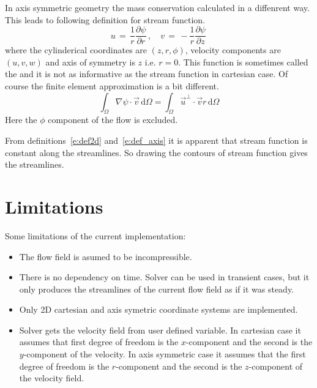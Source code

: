 \begin{versiona}
In axis symmetric geometry the mass conservation calculated in a diffenrent way.
This leads to following definition for stream function. 
\begin{equation}\label{e:def_axis}
u \, = \, \frac{1}{r}\frac{\partial \psi}{\partial r} \, , \quad
v \, = \, - \frac{1}{r}\frac{\partial \psi}{\partial z} \,
\end{equation}
where the cylinderical coordinates are $(z,r,\phi)$, velocity components
are $(u,v,w)$ and axis of symmetry is $z$ i.e. $r=0$.
This function is sometimes called the \emph{} 
and it is not as informative as the stream function in cartesian case.
Of course the finite element approximation is a bit different.
\begin{equation}
\int_\Omega \nabla \psi \cdot \vec v \, \text{d}\Omega
=
\int_\Omega \vec u^\perp \cdot \vec v r \, \text{d}\Omega
\end{equation}
Here the $\phi$ component of the flow is excluded.

From definitions~\eqref{e:def2d} and~\eqref{e:def_axis} it is apparent that 
stream function is constant along the streamlines. So drawing the contours 
of stream function gives the streamlines.

\section{Limitations}

Some limitations of the current implementation:
\begin{itemize}

\item The flow field is asumed to be incompressible.

\item There is no dependency on time. Solver can be used in transient cases, but
it only produces the streamlines of the current flow field as if it was steady. 

\item Only 2D cartesian and axis symetric coordinate systems are implemented.

\item Solver gets the velocity field from user defined variable. In cartesian case
it assumes that first degree of freedom is the $x$-component and the second is the
$y$-component of the velocity. In axis symmetric case it assumes that the first
degree of freedom is the $r$-component and the second is the $z$-component of
the velocity field.


\end{itemize}
\end{versiona}

